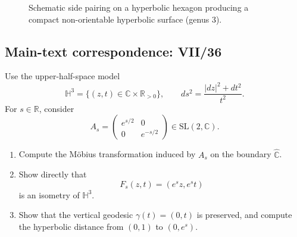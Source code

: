 \begin{solution}
\begin{figure}[htbp]
		\caption{Schematic side pairing on a hyperbolic hexagon producing a compact non-orientable hyperbolic surface (genus $3$).}
	\end{figure}
	
	\clearpage
	
\end{solution}

\subsection*{Main-text correspondence: VII/36}

\begin{problem}
\label{prob:cp-vii-0090}
Use the upper-half-space model
\[
\mathbb{H}^3
=
\{(z,t)\in\mathbb{C}\times\mathbb{R}_{>0}\},
\qquad
ds^2=\frac{|dz|^2+dt^2}{t^2}.
\]
For \(s\in\mathbb{R}\), consider
\[
A_s=
\begin{pmatrix}
e^{s/2}&0\\
0&e^{-s/2}
\end{pmatrix}
\in \mathrm{SL}(2,\mathbb{C}).
\]

\begin{enumerate}
\item Compute the M\"{o}bius transformation induced by \(A_s\) on the
      boundary \(\widehat{\mathbb{C}}\).
\item Show directly that
      \[
      F_s(z,t)=(e^s z,e^s t)
      \]
      is an isometry of \(\mathbb{H}^3\).
\item Show that the vertical geodesic \(\gamma(t)=(0,t)\) is preserved,
      and compute the hyperbolic distance from \((0,1)\) to \((0,e^s)\).
\end{enumerate}
\end{problem}

